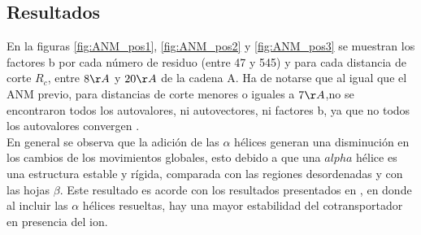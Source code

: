 \subsection{Resultados}
En la figuras%
\ref{fig:ANM_pos1}, \ref{fig:ANM_pos2} y \ref{fig:ANM_pos3} %
se muestran los factores b por cada n\'{u}mero de residuo (entre 47 y 545) y para cada distancia de corte $R_c$, entre $8\AA$ y $20\AA$ de la cadena A. Ha de notarse que al igual que el ANM previo, para distancias de corte menores o iguales a $7\AA$,no se encontraron todos  los autovalores, ni autovectores, ni factores b, ya que no todos los autovalores convergen \cite{Zimmermann2011}.\\

En general se observa que la adici\'{o}n de las $\alpha$ h\'{e}lices generan una disminuci\'{o}n en los cambios de los movimientos globales, esto debido a que una $alpha$ h\'{e}lice es una estructura estable y r\'{i}gida, comparada con las regiones desordenadas y con las hojas $\beta$. Este resultado es acorde con los resultados presentados en \cite{Adelman2016}, en donde al incluir las $\alpha$ h\'{e}lices resueltas, hay una mayor estabilidad del cotransportador en presencia del ion.\\
